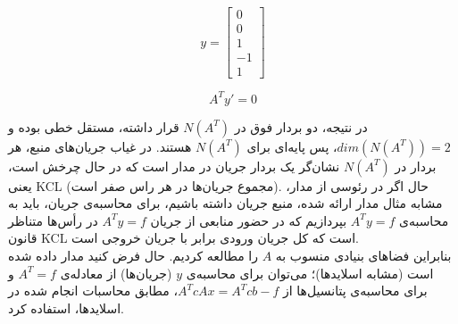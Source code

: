 $$
y = \begin{bmatrix}
0 \\ 0 \\ 1 \\ -1 \\ 1
\end{bmatrix} 
$$

$$ A^T y' = 0 $$

در نتیجه، دو بردار فوق در $N(A^T)$ قرار داشته، مستقل خطی بوده و $dim(N(A^T)) = 2$، پس پایه‌ای برای $N(A^T)$ هستند. در غیاب جریان‌های منبع، هر بردار در $N(A^T)$ نشان‌گر یک بردار جریان در مدار است که در حال چرخش است، یعنی KCL (مجموع جریان‌ها در هر راس صفر است).
حال اگر در رئوسی از مدار، مشابه مثال مدار ارائه شده، منبع جریان داشته باشیم، برای محاسبه‌ی جریان، باید به محاسبه‌ی $A^Ty=f$ بپردازیم که در حضور منابعی از جریان $A^Ty=f$ در رأس‌ها متناظر قانون KCL است که کل جریان ورودی برابر با جریان خروجی است. \\
بنابراین فضا‌های بنیادی منسوب به $A$ را مطالعه کردیم. حال فرض کنید مدار داده شده است (مشابه اسلاید‌ها)؛ می‌توان برای محاسبه‌ی $y$ (جریان‌ها) از معادله‌ی $A^T=f$ و برای محاسبه‌ی پتانسیل‌ها از $A^TcAx=A^Tcb-f$، مطابق محاسبات انجام شده در اسلاید‌ها، ‌استفاده کرد.

